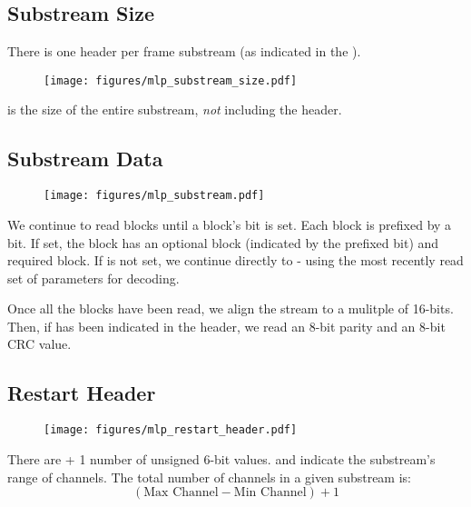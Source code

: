 \subsection{Substream Size}
There is one  header per frame substream
(as indicated in the ).
\begin{figure}[h]
\texttt{[image: figures/mlp\_substream\_size.pdf]}
\end{figure}
\par
\noindent
{} is the size of the entire substream,
\textit{not} including the header.

\clearpage

\subsection{Substream Data}

\begin{figure}[h]
\texttt{[image: figures/mlp\_substream.pdf]}
\end{figure}
We continue to read blocks until a block's  bit is set.
Each block is prefixed by a  bit.
If set, the block has an optional  block
(indicated by the prefixed  bit)
and required  block.
If  is not set, we continue directly to
 - using the most recently read set of parameters for
decoding.

Once all the blocks have been read, we align the stream to a
mulitple of 16-bits.
Then, if  has been indicated in the
 header, we read an 8-bit parity
and an 8-bit CRC value.

\subsection{Restart Header}
\begin{figure}[h]
\texttt{[image: figures/mlp\_restart\_header.pdf]}
\end{figure}
\par
\noindent
There are  + 1 number of
unsigned 6-bit  values.
 and  indicate the substream's
range of channels.
The total number of channels in a given substream is:
\begin{equation*}
(\text{Max Channel} - \text{Min Channel}) + 1
\end{equation*}

